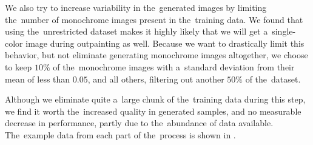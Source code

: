 We also try to increase variability in the~generated images by limiting the~number of monochrome images present in the~training data. We found that using the~unrestricted dataset makes it highly likely that we will get a~single-color image during outpainting as well. Because we want to drastically limit this behavior, but not eliminate generating monochrome images altogether, we choose to keep $10\%$ of the~monochrome images with a~standard deviation from their mean of less than $0.05$, and all others, filtering out another $50\%$ of the~dataset. 

Although we eliminate quite a~large chunk of the~training data during this step, we find it worth the~increased quality in generated samples, and no measurable decrease in performance, partly due to the~abundance of data available. The~example data from each part of the~process is shown in .




